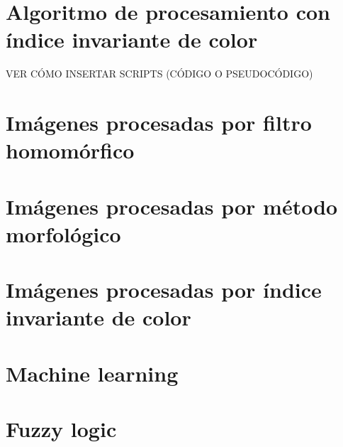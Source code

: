 \documentclass[11pt,a4paper]{report}
\begin{document}
\chapter{Algoritmo de procesamiento con índice invariante de color} 
\color{red} VER CÓMO INSERTAR SCRIPTS (CÓDIGO O PSEUDOCÓDIGO)
\color{black}
\chapter{Imágenes procesadas por filtro homomórfico} \label{anexo_homo}
 
\chapter{Imágenes procesadas por método morfológico} \label{anexo_morfo}
 \chapter{Imágenes procesadas por índice invariante de color} \label{anexo_IIC}
 
\chapter{Machine learning} 
\chapter{Fuzzy logic} 
    

	


\printbibliography[title={Referencias}, heading=bibintoc]
\end{document}
